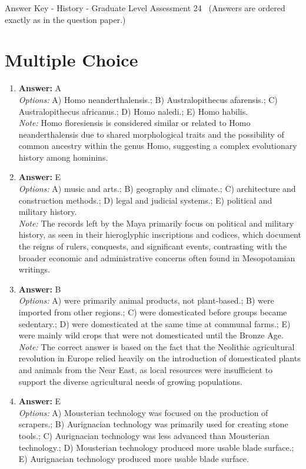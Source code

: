 \documentclass[12pt]{article}
\begin{document}
\begin{center}
Answer Key - History - Graduate Level Assessment 24 \
\small (Answers are ordered exactly as in the question paper.)
\end{center}

\section*{Multiple Choice}
\begin{enumerate}[label=\arabic*.]
\item \textbf{Answer:} A
\\ \textit{Options:} A) Homo neanderthalensis.; B) Australopithecus afarensis.; C) Australopithecus africanus.; D) Homo naledi.; E) Homo habilis.
\\ \textit{Note:} Homo floresiensis is considered similar or related to Homo neanderthalensis due to shared morphological traits and the possibility of common ancestry within the genus Homo, suggesting a complex evolutionary history among hominins.
\item \textbf{Answer:} E
\\ \textit{Options:} A) music and arts.; B) geography and climate.; C) architecture and construction methods.; D) legal and judicial systems.; E) political and military history.
\\ \textit{Note:} The records left by the Maya primarily focus on political and military history, as seen in their hieroglyphic inscriptions and codices, which document the reigns of rulers, conquests, and significant events, contrasting with the broader economic and administrative concerns often found in Mesopotamian writings.
\item \textbf{Answer:} B
\\ \textit{Options:} A) were primarily animal products, not plant-based.; B) were imported from other regions.; C) were domesticated before groups became sedentary.; D) were domesticated at the same time at communal farms.; E) were mainly wild crops that were not domesticated until the Bronze Age.
\\ \textit{Note:} The correct answer is based on the fact that the Neolithic agricultural revolution in Europe relied heavily on the introduction of domesticated plants and animals from the Near East, as local resources were insufficient to support the diverse agricultural needs of growing populations.
\item \textbf{Answer:} E
\\ \textit{Options:} A) Mousterian technology was focused on the production of scrapers.; B) Aurignacian technology was primarily used for creating stone tools.; C) Aurignacian technology was less advanced than Mousterian technology.; D) Mousterian technology produced more usable blade surface.; E) Aurignacian technology produced more usable blade surface.

\end{enumerate}
\end{document}
